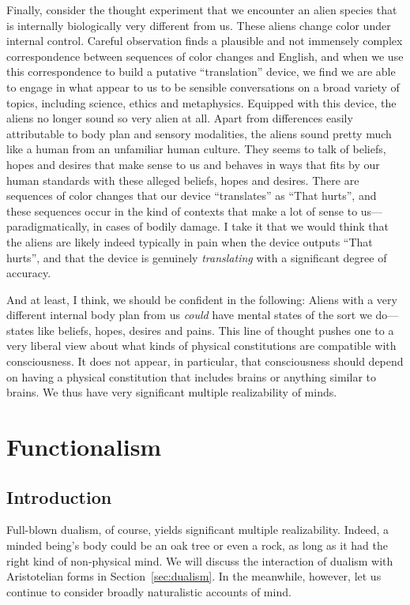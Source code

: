 Finally, consider the thought experiment that we encounter an alien species that is internally biologically very
different from us. These aliens change color under internal control. Careful observation finds a plausible
and not immensely complex correspondence between sequences of color changes and English, and when we use 
this correspondence to build a putative ``translation'' device, we find we are able to engage in what appear
to us to be sensible conversations on a broad variety of topics, including science, ethics and metaphysics.
Equipped with this device, the aliens no longer sound so very alien at all. Apart from differences easily
attributable to body plan and sensory modalities, the aliens sound pretty much like a human from an
unfamiliar human culture. They seems to talk of beliefs, hopes and desires that make sense to us and behaves in ways
that fits by our human standards with these alleged beliefs, hopes and desires. There are sequences of
color changes that our device ``translates'' as ``That hurts'', and these sequences occur in the kind of 
contexts that make a lot of sense to us---paradigmatically, in cases of bodily damage. I take it that
we would think that the aliens are likely indeed typically in pain when the device outputs 
``That hurts'', and that the device is genuinely \textit{translating} with a significant degree of accuracy.

And at least, I think, we should be confident in the following: Aliens with a very different internal body plan
from us \textit{could} have mental states of the sort we do---states
like beliefs, hopes, desires and pains. 
This line of thought pushes one to a very liberal view about what kinds of physical constitutions are compatible with consciousness.
It does not appear, in particular, that consciousness should depend on having a physical constitution that includes brains or anything
similar to brains. We thus have very significant multiple realizability of minds.

\section{Functionalism}\label{sec:functionalism}
\subsection{Introduction}
Full-blown dualism, of course, yields significant multiple realizability. Indeed, a minded being's body could be an oak tree or even a 
rock, as long as it had the right kind of non-physical mind. We will discuss the interaction of dualism with Aristotelian
forms in Section~\ref{sec:dualism}. In the meanwhile, however, let us continue to consider broadly naturalistic accounts of mind.


